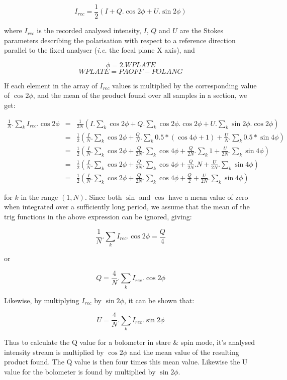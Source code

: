 \documentclass[twoside,11pt]{starlink}
\begin{document}
\[ I_{rec} = \frac{1}{2}( I + Q.\cos 2\phi + U.\sin 2\phi ) \]

where $I_{rec}$ is the recorded analysed intensity, $I$, $Q$ and $U$ are
the Stokes parameters describing the polarisation with respect to a
reference direction parallel to the fixed analyser (\emph{i.e.} the focal
plane X axis), and

\[ \phi = 2.WPLATE \]
\[ WPLATE = PAOFF - POLANG \]

If each element in the array of $I_{rec}$ values is multiplied by the
corresponding value of $\cos 2\phi$, and the mean of the product found
over all samples in a section, we get:

\begin{eqnarray*}
 \frac{1}{N}.\sum_{k} I_{rec}.\cos 2\phi & = & \frac{1}{2N}( I.\sum_{k}
\cos 2\phi + Q.\sum_{k} \cos 2\phi.\cos 2\phi + U.\sum_{k} \sin
2\phi.\cos 2\phi ) \\
 &  = & \frac{1}{2}( \frac{I}{N}.\sum_{k} \cos 2\phi + \frac{Q}{N}.\sum_{k} 0.5*( \cos 4\phi + 1 ) + \frac{U}{N}.\sum_{k} 0.5*\sin 4\phi ) \\
 & = & \frac{1}{2}( \frac{I}{N}.\sum_{k} \cos 2\phi + \frac{Q}{2N}.\sum_{k} \cos 4\phi + \frac{Q}{2N}.\sum_{k} 1 + \frac{U}{2N}.\sum_{k} \sin 4\phi ) \\
 & = & \frac{1}{2}( \frac{I}{N}.\sum_{k} \cos 2\phi + \frac{Q}{2N}.\sum_{k} \cos 4\phi + \frac{Q}{2N}.N + \frac{U}{2N}.\sum_{k} \sin 4\phi ) \\
 & = & \frac{1}{2}( \frac{I}{N}.\sum_{k} \cos 2\phi + \frac{Q}{2N}.\sum_{k} \cos 4\phi + \frac{Q}{2} + \frac{U}{2N}.\sum_{k} \sin 4\phi )
\end{eqnarray*}

for $k$ in the range $(1,N)$. Since both $\sin$ and $\cos$ have a mean value
of zero when integrated over a sufficiently long period, we assume that the
mean of the trig functions in the above expression can be ignored, giving:

\[ \frac{1}{N}.\sum_{k} I_{rec}.\cos 2\phi  =  \frac{Q}{4} \]

or

\[ Q = \frac{4}{N}.\sum_{k} I_{rec}.\cos 2\phi \]

Likewise, by multiplying $I_{rec}$ by $\sin 2\phi$, it can be shown that:

\[ U = \frac{4}{N}.\sum_{k} I_{rec}.\sin 2\phi \]


Thus to calculate the Q value for a bolometer in stare \& spin mode, it's
analysed intensity stream is multiplied by $\cos 2\phi$ and the mean value
of the resulting product found. The Q value is then four times this mean
value.  Likewise the U value for the bolometer is found by multiplied by
$\sin 2\phi$.
\end{document}
